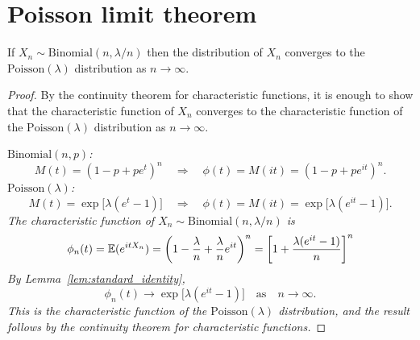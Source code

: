 


\section{Poisson limit theorem}

\begin{theorem}
If $X_n\sim\text{Binomial}(n,\lambda/n)$ then the distribution of $X_n$ converges to the $\text{Poisson}(\lambda)$ distribution as $n\to\infty$.
\end{theorem}

\begin{proof}
By the continuity theorem for characteristic functions, it is enough to show that the characteristic function of $X_n$ converges to the characteristic function of the $\text{Poisson}(\lambda)$ distribution as $n\to\infty$. 

\bit
\it $\text{Binomial}(n,p)$: $$M(t)=(1-p+pe^t)^n \quad\Rightarrow\quad \phi(t)=M(it)=(1-p+pe^{it})^n.$$
\it $\text{Poisson}(\lambda)$: $$M(t)=\exp\big[\lambda(e^t-1)\big] \quad\Rightarrow\quad \phi(t)=M(it)=\exp\big[\lambda(e^{it}-1)\big].$$
\eit
The characteristic function of $X_n\sim\text{Binomial}(n,\lambda/n)$ is 
\[
\phi_n(t) = \mathbb{E}(e^{itX_n}) 
	= \left(1-\frac{\lambda}{n} + \frac{\lambda}{n}e^{it}\right)^n
	= \left[1 + \frac{\lambda(e^{it}-1)}{n}\right]^n
\]
By Lemma~\ref{lem:standard_identity},
\[
\phi_n(t) \to \exp\big[\lambda(e^{it}-1)\big]\quad\text{as}\quad n\to\infty.
\]
This is the characteristic function of the $\text{Poisson}(\lambda)$ distribution, and the result follows by the continuity theorem for characteristic functions.
\end{proof}

